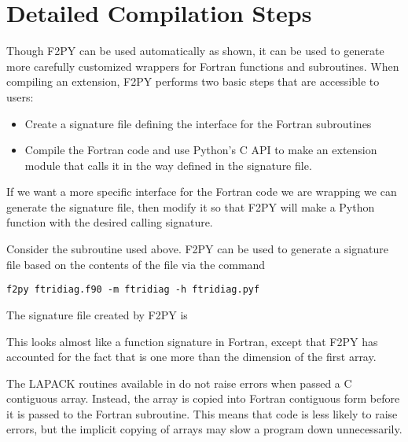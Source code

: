 \section*{Detailed Compilation Steps}
Though F2PY can be used automatically as shown, it can be used to generate more carefully customized wrappers for Fortran functions and subroutines.
When compiling an extension, F2PY performs two basic steps that are accessible to users:
\begin{itemize}
\item Create a  signature file defining the interface for the Fortran subroutines
\item Compile the Fortran code and use Python's C API to make an extension module that calls it in the way defined in the signature file.
\end{itemize}
If we want a more specific interface for the Fortran code we are wrapping we can generate the signature file, then modify it so that F2PY will make a Python function with the desired calling signature.

Consider the  subroutine used above.
F2PY can be used to generate a signature file based on the contents of the file  via the command
\begin{lstlisting}[style=ShellInput]
f2py ftridiag.f90 -m ftridiag -h ftridiag.pyf
\end{lstlisting}
The signature file created by F2PY is

This looks almost like a function signature in Fortran, except that F2PY has accounted for the fact that  is one more than the dimension of the first array.





\begin{warn}
The LAPACK routines available in  do not raise errors when passed a C contiguous array.
Instead, the array is copied into Fortran contiguous form before it is passed to the Fortran subroutine.
This means that code is less likely to raise errors, but the implicit copying of arrays may slow a program down unnecessarily.
\end{warn}


